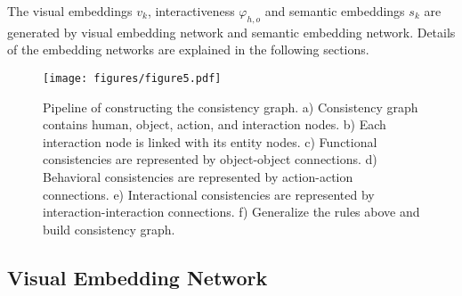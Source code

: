 \documentclass[sigconf,screen]{acmart}
\begin{document}
The visual embeddings $v_k$, interactiveness $\varphi_{h, o}$ and semantic embeddings $s_k$ are generated by visual embedding network and semantic embedding network. Details of the embedding networks are explained in the following sections.

\begin{figure*}
\centering
\texttt{[image: figures/figure5.pdf]}
\caption{Pipeline of constructing the consistency graph. a) Consistency graph contains human, object, action, and interaction nodes. b) Each interaction node is linked with its entity nodes. c) Functional consistencies are represented by object-object connections. d) Behavioral consistencies are represented by action-action connections. e) Interactional consistencies are represented by interaction-interaction connections. f) Generalize the rules above and build consistency graph.}
\label{fig5}
\end{figure*}

\subsection{Visual Embedding Network}\label{3.2}
\end{document}

